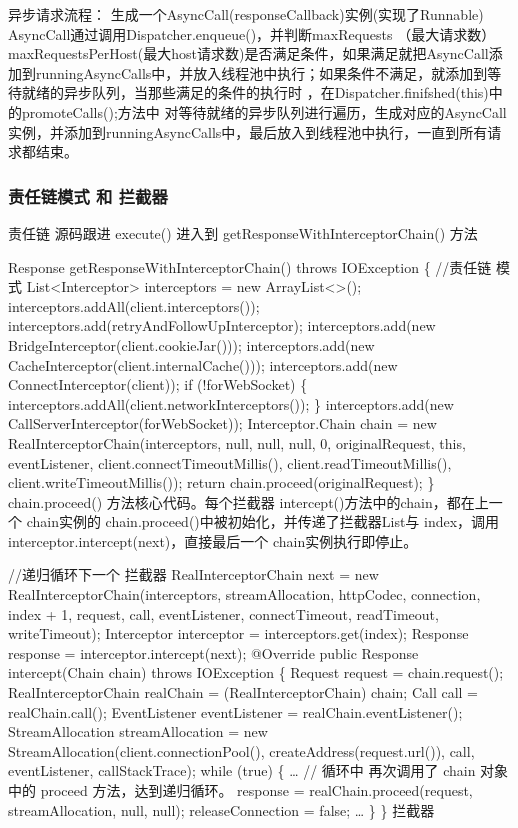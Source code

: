 \documentclass[9pt, b5paper]{article}
\begin{document}
异步请求流程：
生成一个AsyncCall(responseCallback)实例(实现了Runnable)
AsyncCall通过调用Dispatcher.enqueue()，并判断maxRequests （最大请求数）maxRequestsPerHost(最大host请求数)是否满足条件，如果满足就把AsyncCall添加到runningAsyncCalls中，并放入线程池中执行；如果条件不满足，就添加到等待就绪的异步队列，当那些满足的条件的执行时 ，在Dispatcher.finifshed(this)中的promoteCalls();方法中 对等待就绪的异步队列进行遍历，生成对应的AsyncCall实例，并添加到runningAsyncCalls中，最后放入到线程池中执行，一直到所有请求都结束。

\subsubsection{责任链模式 和 拦截器}
\label{sec-9-2-1}
责任链
源码跟进 execute() 进入到 getResponseWithInterceptorChain() 方法

Response getResponseWithInterceptorChain() throws IOException \{
    //责任链 模式
    List<Interceptor> interceptors = new ArrayList<>();
    interceptors.addAll(client.interceptors());
    interceptors.add(retryAndFollowUpInterceptor);
    interceptors.add(new BridgeInterceptor(client.cookieJar()));
    interceptors.add(new CacheInterceptor(client.internalCache()));
    interceptors.add(new ConnectInterceptor(client));
    if (!forWebSocket) \{
      interceptors.addAll(client.networkInterceptors());
    \}
    interceptors.add(new CallServerInterceptor(forWebSocket));
    Interceptor.Chain chain = new RealInterceptorChain(interceptors, null, null, null, 0,
        originalRequest, this, eventListener, client.connectTimeoutMillis(),
        client.readTimeoutMillis(), client.writeTimeoutMillis());
    return chain.proceed(originalRequest);
  \}
chain.proceed() 方法核心代码。每个拦截器 intercept()方法中的chain，都在上一个 chain实例的 chain.proceed()中被初始化，并传递了拦截器List与 index，调用interceptor.intercept(next)，直接最后一个 chain实例执行即停止。

//递归循环下一个 拦截器
    RealInterceptorChain next = new RealInterceptorChain(interceptors, streamAllocation, httpCodec,
        connection, index + 1, request, call, eventListener, connectTimeout, readTimeout,
        writeTimeout);
    Interceptor interceptor = interceptors.get(index);
    Response response = interceptor.intercept(next);
@Override public Response intercept(Chain chain) throws IOException \{
    Request request = chain.request();
    RealInterceptorChain realChain = (RealInterceptorChain) chain;
    Call call = realChain.call();
    EventListener eventListener = realChain.eventListener();
    StreamAllocation streamAllocation = new StreamAllocation(client.connectionPool(),
        createAddress(request.url()), call, eventListener, callStackTrace);
    while (true) \{
        \ldots{}
        // 循环中 再次调用了 chain 对象中的 proceed 方法，达到递归循环。
        response = realChain.proceed(request, streamAllocation, null, null);
        releaseConnection = false;
        \ldots{}
    \}
\}
拦截器
\end{document}
